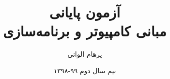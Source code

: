 \documentclass[]{article}
\title{آزمون پایانی\\مبانی کامپیوتر و برنامه‌سازی}
\author{پرهام الوانی}
\date{نیم سال دوم ۹۹-۱۳۹۸}
\begin{document}
    \maketitle

    
    \pagebreak
    
    \pagebreak
    
    \pagebreak
    
    \pagebreak
    
    \pagebreak
    
\end{document}
